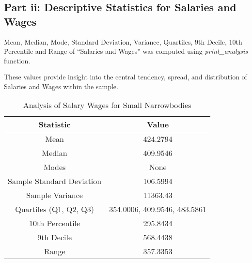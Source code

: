 \subsection{Part ii: Descriptive Statistics for Salaries and Wages}

Mean, Median, Mode, Standard Deviation, Variance, Quartiles, 9th Decile, 10th Percentile and Range of ``Salaries and Wages”
was computed using \textit{print\_analysis} function.



These values provide insight into the central tendency, spread, and distribution of Salaries and Wages within the sample.
\begin{table}[H]
    \centering
    \caption{Analysis of Salary Wages for Small Narrowbodies}
    \begin{tabular}{|c|c|}
        \hline
        Statistic                 & Value                        \\
        \hline
        Mean                      & 424.2794                     \\
        Median                    & 409.9546                     \\
        Modes                     & None                         \\
        Sample Standard Deviation & 106.5994                     \\
        Sample Variance           & 11363.43                     \\
        Quartiles (Q1, Q2, Q3)    & 354.0006, 409.9546, 483.5861 \\
        10th Percentile           & 295.8434                     \\
        9th Decile                & 568.4438                     \\
        Range                     & 357.3353                     \\
        \hline
    \end{tabular}
\end{table}

